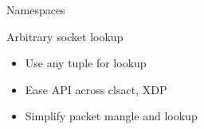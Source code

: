 \documentclass[black,white]{beamer}
\begin{document}

    \begin{frame}[fragile]{Namespaces}
        \vfill
        \centering
        
        \vfill
    \end{frame}

    \begin{frame}{Arbitrary socket lookup}
        \begin{itemize}
            \item Use any tuple for lookup \bigskip
            \item Ease API across clsact, XDP \bigskip
            \item Simplify packet mangle and lookup \bigskip
        \end{itemize}
    \end{frame}
\end{document}
